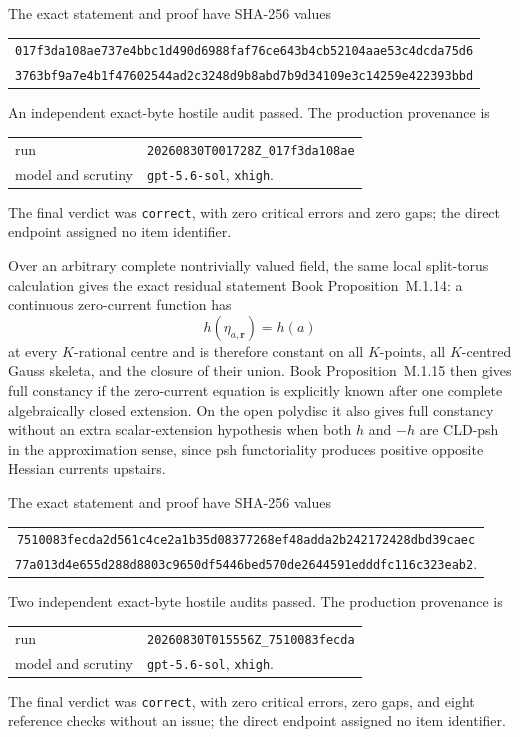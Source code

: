 \documentclass[11pt,a4paper]{article}
\theoremstyle{definition}
\theoremstyle{remark}
\begin{document}
The exact statement and proof have SHA-256 values
\begin{center}
\small
\begin{tabular}{@{}c@{}}
\nolinkurl{017f3da108ae737e4bbc1d490d6988faf76ce643b4cb52104aae53c4dcda75d6}\\
\nolinkurl{3763bf9a7e4b1f47602544ad2c3248d9b8abd7b9d34109e3c14259e422393bbd}
\end{tabular}
\end{center}
An independent exact-byte hostile audit passed.  The production provenance
is
\begin{center}
\small
\begin{tabular}{@{}ll@{}}
run & \nolinkurl{20260830T001728Z_017f3da108ae}\\
model and scrutiny & \texttt{gpt-5.6-sol}, \texttt{xhigh}.
\end{tabular}
\end{center}
The final verdict was \texttt{correct}, with zero critical errors and zero
gaps; the direct endpoint assigned no item identifier.

Over an arbitrary complete nontrivially valued field, the same local
split-torus calculation gives the exact residual statement
Book Proposition~M.1.14: a continuous zero-current function
has
\[
                         h(\eta_{a,\mathbf r})=h(a)
\]
at every \(K\)-rational centre and is therefore constant on all
\(K\)-points, all \(K\)-centred Gauss skeleta, and the closure of their
union.  Book Proposition~M.1.15 then gives full constancy if
the zero-current equation is explicitly known after one complete
algebraically closed extension.  On the open polydisc it also gives full
constancy without an extra scalar-extension hypothesis when both \(h\) and
\(-h\) are CLD-psh in the approximation sense, since psh functoriality
produces positive opposite Hessian currents upstairs.

The exact statement and proof have SHA-256 values
\begin{center}
\small
\begin{tabular}{@{}c@{}}
\nolinkurl{7510083fecda2d561c4ce2a1b35d08377268ef48adda2b242172428dbd39caec}\\
\nolinkurl{77a013d4e655d288d8803c9650df5446bed570de2644591edddfc116c323eab2}.
\end{tabular}
\end{center}
Two independent exact-byte hostile audits passed.  The production provenance
is
\begin{center}
\small
\begin{tabular}{@{}ll@{}}
run & \nolinkurl{20260830T015556Z_7510083fecda}\\
model and scrutiny & \texttt{gpt-5.6-sol}, \texttt{xhigh}.
\end{tabular}
\end{center}
The final verdict was \texttt{correct}, with zero critical errors, zero gaps,
and eight reference checks without an issue; the direct endpoint assigned no
item identifier.
\end{document}
